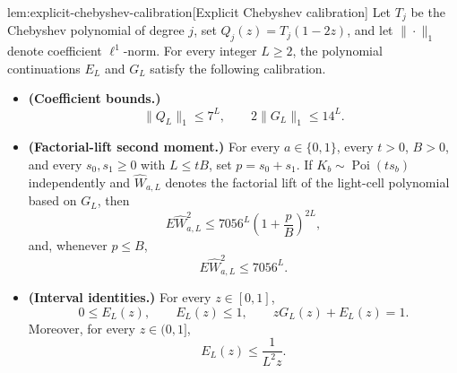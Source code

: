 \documentclass[11pt]{article}
\begin{document}
\begin{lemmav}{lem:explicit-chebyshev-calibration}[Explicit Chebyshev calibration]
Let \(T_j\) be the Chebyshev polynomial of degree \(j\), set \(Q_j(z)=T_j(1-2z)\), and let \(\|\cdot\|_1\) denote coefficient \(\ell^1\)-norm.  For every integer \(L\ge2\), the polynomial continuations \(E_L\) and \(G_L\) satisfy the following calibration.

\begin{itemize}
\item \textbf{(Coefficient bounds.)}
\[
\|Q_L\|_1\le 7^L,
\qquad
2\|G_L\|_1\le 14^L .
\]
\item \textbf{(Factorial-lift second moment.)}
For every \(a\in\{0,1\}\), every \(t>0\), \(B>0\), and every \(s_0,s_1\ge0\) with \(L\le tB\), set \(p=s_0+s_1\).  If \(K_b\sim\operatorname{Poi}(ts_b)\) independently and \(\widehat W_{a,L}\) denotes the factorial lift of the light-cell polynomial based on \(G_L\), then
\[
E\widehat W_{a,L}^{2}
\le
7056^L\left(1+\frac{p}{B}\right)^{2L},
\]
and, whenever \(p\le B\),
\[
E\widehat W_{a,L}^{2}\le 7056^L .
\]
\item \textbf{(Interval identities.)}
For every \(z\in[0,1]\),
\[
0\le E_L(z),
\qquad
E_L(z)\le 1,
\qquad
zG_L(z)+E_L(z)=1 .
\]
Moreover, for every \(z\in(0,1]\),
\[
E_L(z)\le \frac{1}{L^2z}.
\]
\end{itemize}
\end{lemmav}
\end{document}
